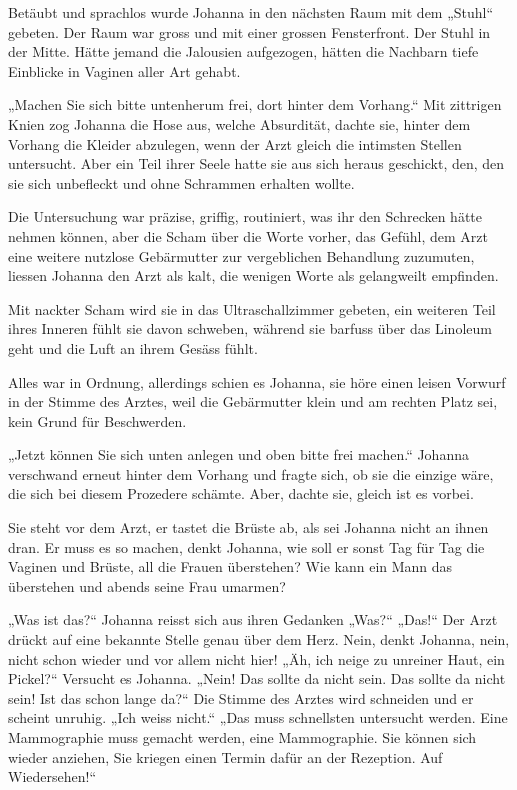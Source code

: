 \documentclass[10pt,titlepage,a5paper]{book}
\begin{document}
Betäubt und sprachlos wurde Johanna in den nächsten Raum mit dem „Stuhl“ gebeten. Der Raum war gross und mit  einer grossen Fensterfront. Der Stuhl in der Mitte. Hätte jemand die Jalousien aufgezogen, hätten die Nachbarn tiefe Einblicke in Vaginen aller Art gehabt.

„Machen Sie sich bitte untenherum frei, dort hinter dem Vorhang.“ Mit zittrigen Knien zog Johanna die Hose aus, welche Absurdität, dachte sie, hinter dem Vorhang die Kleider abzulegen, wenn der Arzt gleich die intimsten Stellen untersucht. Aber ein Teil ihrer Seele hatte sie aus sich heraus geschickt, den, den sie sich unbefleckt und ohne Schrammen erhalten wollte.

Die Untersuchung war präzise, griffig, routiniert, was ihr den Schrecken hätte nehmen können, aber die Scham über die Worte vorher, das Gefühl, dem Arzt eine weitere nutzlose Gebärmutter zur vergeblichen Behandlung zuzumuten, liessen Johanna den Arzt als kalt, die wenigen Worte als gelangweilt empfinden.

Mit nackter Scham wird sie in das Ultraschallzimmer gebeten, ein weiteren Teil ihres Inneren fühlt sie davon schweben, während sie barfuss über das Linoleum geht  und die Luft an ihrem Gesäss fühlt.

Alles war in Ordnung, allerdings schien es Johanna, sie höre einen leisen Vorwurf in der Stimme des Arztes, weil die Gebärmutter klein und am rechten Platz sei, kein Grund für Beschwerden.

„Jetzt können Sie sich unten anlegen und oben bitte frei machen.“ Johanna verschwand erneut hinter dem Vorhang und fragte sich, ob sie die einzige wäre, die sich bei diesem Prozedere schämte. Aber, dachte sie, gleich ist es vorbei. 

Sie steht vor dem Arzt, er tastet die Brüste ab, als sei Johanna nicht an ihnen dran. Er muss es so machen, denkt Johanna, wie soll er sonst Tag für Tag die Vaginen und Brüste, all die Frauen überstehen? Wie kann ein Mann das überstehen und abends seine Frau umarmen?

„Was ist das?“ Johanna reisst sich aus ihren Gedanken „Was?“ „Das!“ Der Arzt drückt auf eine bekannte Stelle genau über dem Herz. Nein, denkt Johanna, nein, nicht schon wieder und vor allem nicht hier! „Äh, ich neige zu unreiner Haut, ein Pickel?“ Versucht es Johanna. „Nein! Das sollte da nicht sein. Das sollte da nicht sein! Ist das schon lange da?“ Die Stimme des Arztes wird schneiden und er scheint unruhig. „Ich weiss nicht.“ „Das muss schnellsten untersucht werden. Eine Mammographie muss gemacht werden, eine Mammographie. Sie können sich wieder anziehen, Sie kriegen einen Termin dafür an der Rezeption. Auf Wiedersehen!“
\end{document}
